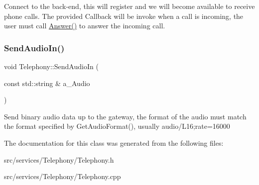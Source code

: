 Connect to the back-\/end, this will register and we will become available to receive phone calls. The provided Callback will be invoke when a call is incoming, the user must call \hyperlink{class_telephony_a390bfb55dc1a6314b9faa43d099c1693}{Answer()} to answer the incoming call. \mbox{\label{class_telephony_a7e6fb76a0d470cce05e70560e3a0f338}} 
\subsubsection{\texorpdfstring{Send\+Audio\+In()}{SendAudioIn()}}
{\footnotesize\ttfamily void Telephony\+::\+Send\+Audio\+In (\begin{DoxyParamCaption}\item[{const std\+::string \&}]{a\+\_\+\+Audio }\end{DoxyParamCaption})}

Send binary audio data up to the gateway, the format of the audio must match the format specified by Get\+Audio\+Format(), usually audio/\+L16;rate=16000 

The documentation for this class was generated from the following files\+:\begin{DoxyCompactItemize}
\item 
src/services/\+Telephony/Telephony.\+h\item 
src/services/\+Telephony/Telephony.\+cpp\end{DoxyCompactItemize}
